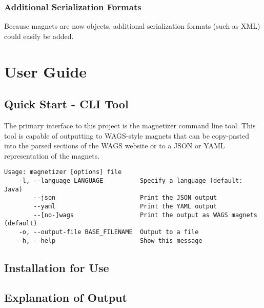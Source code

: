\documentclass[letter,10pt]{article}
\begin{document}
\subsubsection{Additional Serialization Formats}

Because magnets are now objects, additional serialization formats (such 
as XML) could easily be added. 



\section{User Guide}

\subsection{Quick Start - CLI Tool}

The primary interface to this project is the magnetizer command line 
tool. This tool is capable of outputting to WAGS-style magnets that can 
be copy-pasted into the parsed sections of the WAGS website or to a 
JSON or YAML representation of the magnets.

\begin{verbatim}
Usage: magnetizer [options] file
    -l, --language LANGUAGE          Specify a language (default: Java)
        --json                       Print the JSON output
        --yaml                       Print the YAML output
        --[no-]wags                  Print the output as WAGS magnets 
(default)
    -o, --output-file BASE_FILENAME  Output to a file
    -h, --help                       Show this message
\end{verbatim}



\subsection{Installation for Use}

\subsection{Explanation of Output}
\end{document}
